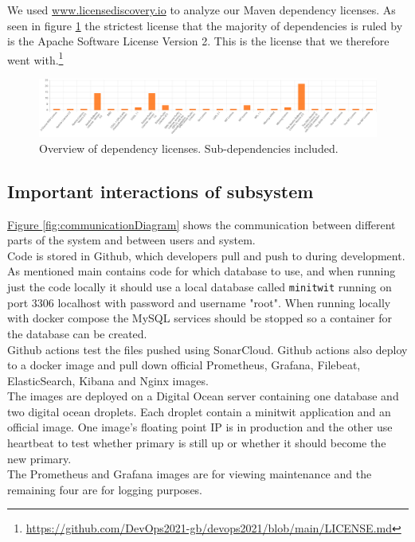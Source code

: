 We used \url{www.licensediscovery.io} to analyze our Maven dependency licenses. As seen in figure \ref{fig:licenceDep} the strictest license that the majority of dependencies is ruled by is the Apache Software License Version 2. This is the license that we therefore went with.\footnote{\url{https://github.com/DevOps2021-gb/devops2021/blob/main/LICENSE.md}} 
\begin{figure}[!htb]
    \centering
    \includegraphics[scale=0.2]{images/LicenceDependencies.png}
    \caption{Overview of dependency licenses. Sub-dependencies included.}
    \label{fig:licenceDep}
\end{figure}


\subsection{Important interactions of subsystem}
\hyperref[fig:componentDiagram]{Figure \ref{fig:communicationDiagram}} shows the communication between different parts of the system and between users and system.\\
Code is stored in Github, which developers pull and push to during development. As mentioned main contains code for which database to use, and when running just the code locally it should use a local database called \texttt{minitwit} running on port 3306 localhost with password and username "root". When running locally with docker compose the MySQL services should be stopped so a container for the database can be created.\\
Github actions test the files pushed using SonarCloud. Github actions also deploy to a docker image and pull down official Prometheus, Grafana, Filebeat, ElasticSearch, Kibana and Nginx images.\\
The images are deployed on a Digital Ocean server containing one database and two digital ocean droplets. Each droplet contain a minitwit application and an official image. One image's floating point IP is in production and the other use heartbeat to test whether primary is still up or whether it should become the new primary.
\\
The Prometheus and Grafana images are for viewing maintenance and the remaining four are for logging purposes.

